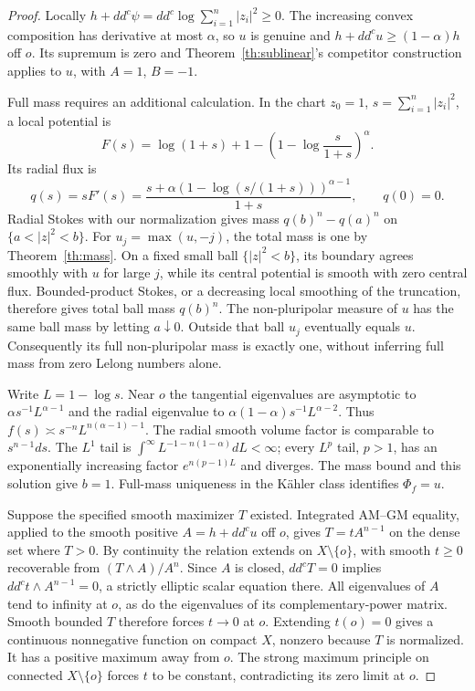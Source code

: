 \documentclass[11pt]{article}
\newcommand{\ddc}{dd^c}
\newcommand{\1}{\mathbf 1}
\theoremstyle{remark}\newtheorem{remark}[theorem]{Remark}
\begin{document}
\begin{proof}
Locally $h+\ddc\psi=\ddc\log\sum_{i=1}^n|z_i|^2\geq0$.
The increasing convex composition has derivative at most $\alpha$,
so $u$ is genuine and $h+\ddc u\geq(1-\alpha)h$ off $o$.
Its supremum is zero and Theorem~\ref{th:sublinear}'s competitor construction
applies to $u$, with $A=1$, $B=-1$.

Full mass requires an additional calculation.
In the chart $z_0=1$, $s=\sum_{i=1}^n|z_i|^2$, a local potential is
\[
 F(s)=\log(1+s)+1-\left(1-\log\frac{s}{1+s}\right)^\alpha.
\]
Its radial flux is
\[
 q(s)=sF'(s)=\frac{s+\alpha(1-\log(s/(1+s)))^{\alpha-1}}{1+s},
 \qquad q(0)=0.
\]
Radial Stokes with our normalization gives mass
$q(b)^n-q(a)^n$ on $\{a<|z|^2<b\}$.
For $u_j=\max(u,-j)$, the total mass is one by Theorem~\ref{th:mass}.
On a fixed small ball $\{|z|^2<b\}$, its boundary agrees smoothly with $u$
for large $j$, while its central potential is smooth with zero central flux.
Bounded-product Stokes, or a decreasing local smoothing of the truncation,
therefore gives total ball mass $q(b)^n$.
The non-pluripolar measure of $u$ has the same ball mass by letting $a\downarrow0$.
Outside that ball $u_j$ eventually equals $u$.
Consequently its full non-pluripolar mass is exactly one, without inferring
full mass from zero Lelong numbers alone.

Write $L=1-\log s$. Near $o$ the tangential eigenvalues are asymptotic to
$\alpha s^{-1}L^{\alpha-1}$ and the radial eigenvalue to
$\alpha(1-\alpha)s^{-1}L^{\alpha-2}$.
Thus $f(s)\asymp s^{-n}L^{n(\alpha-1)-1}$.
The radial smooth volume factor is comparable to $s^{n-1}ds$.
The $L^1$ tail is $\int^\infty L^{-1-n(1-\alpha)}dL<\infty$;
every $L^p$ tail, $p>1$, has an exponentially increasing factor
$e^{n(p-1)L}$ and diverges.
The mass bound and this solution give $b=1$.
Full-mass uniqueness in the K\"ahler class
\cite[Theorem 3.1 and \S3.3]{BEGZ} identifies $\Phi_f=u$.

Suppose the specified smooth maximizer $T$ existed.
Integrated AM--GM equality, applied to the smooth positive
$A=h+\ddc u$ off $o$, gives $T=tA^{n-1}$ on the dense set where $T>0$.
By continuity the relation extends on $X\setminus\{o\}$, with smooth
$t\geq0$ recoverable from $(T\wedge A)/A^n$.
Since $A$ is closed, $\ddc T=0$ implies
$\ddc t\wedge A^{n-1}=0$, a strictly elliptic scalar equation there.
All eigenvalues of $A$ tend to infinity at $o$, as do the eigenvalues of
its complementary-power matrix. Smooth bounded $T$ therefore forces
$t\to0$ at $o$. Extending $t(o)=0$ gives a continuous nonnegative function
on compact $X$, nonzero because $T$ is normalized.
It has a positive maximum away from $o$.
The strong maximum principle \cite[pp.~131--132]{Gaud} on connected
$X\setminus\{o\}$ forces $t$ to be constant, contradicting its zero
limit at $o$.
\end{proof}
\end{document}

